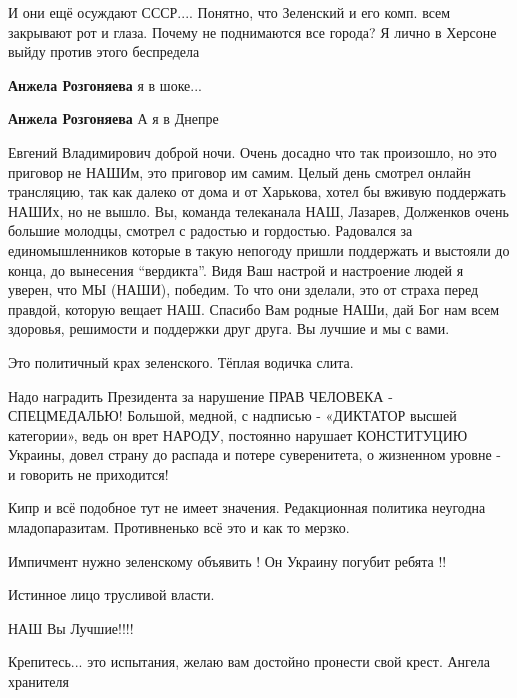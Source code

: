 \begin{itemize}

И они ещё осуждают СССР.... Понятно, что Зеленский и его комп. всем закрывают
рот и глаза. Почему не поднимаются все города? Я лично в Херсоне выйду против
этого беспредела

\begin{itemize} %
\textbf{Анжела Розгоняева} я в шоке...

\textbf{Анжела Розгоняева} А я в Днепре
\end{itemize} %


Евгений Владимирович доброй ночи. Очень досадно что так произошло, но это
приговор не НАШИм, это приговор им самим. Целый день смотрел онлайн трансляцию,
так как далеко от дома и от Харькова, хотел бы вживую поддержать НАШИх, но не
вышло. Вы, команда телеканала НАШ, Лазарев, Долженков очень большие молодцы,
смотрел с радостью и гордостью. Радовался за единомышленников которые в такую
непогоду пришли поддержать и выстояли до конца, до вынесения \enquote{вердикта}. Видя
Ваш настрой и настроение людей я уверен, что МЫ (НАШИ), победим. То что они
зделали, это от страха перед правдой, которую вещает НАШ. Спасибо Вам родные
НАШи, дай Бог нам всем здоровья, решимости и поддержки друг друга. Вы лучшие и
мы с вами.

Это политичный крах зеленского. Тёплая водичка слита.


Надо наградить Президента за нарушение ПРАВ ЧЕЛОВЕКА - СПЕЦМЕДАЛЬЮ! Большой,
медной, с надписью - «ДИКТАТОР высшей категории», ведь он врет НАРОДУ,
постоянно нарушает КОНСТИТУЦИЮ Украины, довел страну до распада и потере
суверенитета, о жизненном уровне - и говорить не приходится!


Кипр и всё подобное тут не имеет значения. Редакционная политика неугодна
младопаразитам. Противненько всё это и как то мерзко.

Импичмент нужно зеленскому объявить ! Он Украину погубит ребята !!

Истинное лицо трусливой власти.

НАШ Вы Лучшие!!!!

Крепитесь... это испытания, желаю вам достойно пронести свой крест. Ангела хранителя


\end{itemize}
